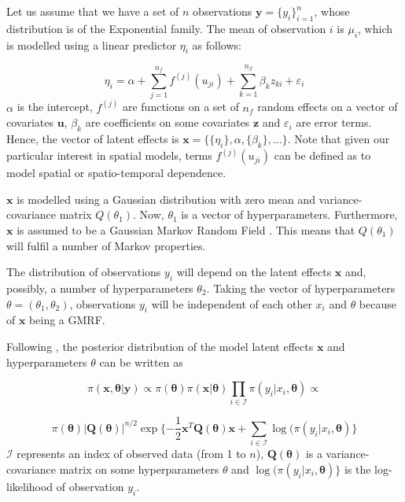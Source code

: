 \documentclass[article]{jss}
\begin{document}
Let us assume that we have a set of $n$ observations 
$\mathbf{y}=\{y_i\}_ {i=1}^n$, whose distribution is of the Exponential family.
The mean of observation $i$ is $\mu_i$, which is modelled using a linear
predictor $\eta_i$ as follows:

\begin{equation}
\eta_i=\alpha+\sum_{j=1}^{n_f} f^{(j)}(u_{ji})+\sum_{k=1}^{n_{\beta}}\beta_k z_{ki}+\varepsilon_i
\end{equation}
\noindent
$\alpha$ is the intercept, $f^{(j)}$ are functions on a set of $n_f$ random
effects on a vector of covariates $\mathbf{u}$, $\beta_k$ are coefficients on
some covariates $\mathbf{z}$ and $\varepsilon_i$ are error terms. Hence, the
vector of latent effects is $\mathbf{x}=\{\{\eta_i\}, \alpha, \{\beta_k\},
\ldots\}$. Note that given our particular interest in spatial models, terms
$f^{(j)}(u_{ji})$ can be defined as to model spatial or spatio-temporal
dependence.

$\mathbf{x}$ is modelled using a Gaussian distribution with zero mean and
variance-covariance matrix $Q(\theta_1)$. Now, $\theta_1$ is a vector of
hyperparameters. Furthermore, $\mathbf{x}$ is assumed to be a Gaussian Markov
Random Field \citep[GMRF,][]{rueheld:2005}. This means that  $Q(\theta_1)$ will fulfil a number of
Markov properties. 

The distribution of observations $y_i$ will depend on the latent effects
$\mathbf{x}$ and, possibly, a number of hyperparameters $\theta_2$.  Taking
the vector of hyperparameters $\theta=(\theta_1, \theta_2)$, observations
$y_i$ will be independent of each other $x_i$ and $\theta$ because
of $\mathbf{x}$ being a GMRF.

Following \citet{isi:000264374200002}, the posterior distribution of the model
latent effects $\mathbf{x}$ and hyperparameters $\theta$ can be written as 

\begin{equation}
\pi(\mathbf{x}, \mathbf{\theta}|\mathbf{y}) \propto
\pi(\mathbf{\theta}) \pi(\mathbf{x}|\mathbf{\theta})\prod_{i\in \mathcal{I}}\pi(y_i|x_i,\mathbf{\theta})
\propto 
\end{equation}

\begin{equation}
\pi(\mathbf{\theta}) |\mathbf{Q}(\mathbf{\theta})|^{n/2} \exp\{-\frac{1}{2}\mathbf{x}^T \mathbf{Q}(\mathbf{\theta}) \mathbf{x}+\sum_{i\in\mathcal{I}} \log(\pi(y_i|x_i, \mathbf{\theta}) \}
\end{equation}
\noindent
$\mathcal{I}$ represents an index of observed data (from 1 to $n$),
$\mathbf{Q}(\mathbf{\theta})$ is a variance-covariance matrix on some
hyperparameters $\theta$ and $\log(\pi(y_i|x_i, \mathbf{\theta}) \}$ is
the log-likelihood of observation $y_i$.
\end{document}
